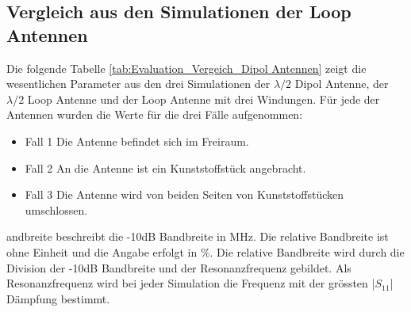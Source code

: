



\newpage
\subsection{Vergleich aus den Simulationen der Loop Antennen}
Die folgende Tabelle \ref{tab:Evaluation_Vergeich_Dipol Antennen} zeigt die wesentlichen Parameter aus den drei Simulationen der $\lambda/2$ Dipol Antenne, der $\lambda/2$ Loop Antenne und der Loop Antenne mit drei Windungen. Für jede der Antennen wurden die Werte für die drei Fälle aufgenommen:\\
\begin{itemize}
\item Fall 1 Die Antenne befindet sich im Freiraum.
\item Fall 2 An die Antenne ist ein Kunststoffstück angebracht.
\item Fall 3 Die Antenne wird von beiden Seiten von Kunststoffstücken umschlossen.
\end{itemize}
andbreite beschreibt die -10dB Bandbreite in MHz. Die relative Bandbreite ist ohne Einheit und die Angabe erfolgt in $\%$. Die relative Bandbreite wird durch die Division der -10dB Bandbreite und der Resonanzfrequenz gebildet. Als Resonanzfrequenz wird bei jeder Simulation die Frequenz mit der grössten |$S_{11}$| Dämpfung bestimmt.\\

